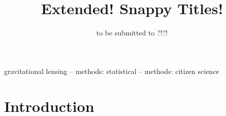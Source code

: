 \documentclass[useAMS,usenatbib,a4paper]{mn2e}
\title[\sw]
{\SW Extended! Snappy Titles!}
\author[Davis et al.]{%
  
}
\begin{document}
\date{to be submitted to ?!?!}
\pagerange{\pageref{firstpage}--\pageref{lastpage}}

\maketitle

\label{firstpage}


\begin{abstract}


\end{abstract}


\begin{keywords}
  gravitational lensing   --
  methods: statistical    --
  methods: citizen science
\end{keywords}

\setcounter{footnote}{1}


\section{Introduction}
\label{sec:intro}


\end{document}
